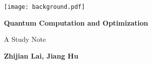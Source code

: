 \documentclass[
	11pt, %
	fleqn, %
	a4paper, %
]{LegrandOrangeBook}
\begin{document}

\titlepage %
	{\texttt{[image: background.pdf]}} %
	{ %
		\centering\sffamily %
		{\Huge\bfseries
        Quantum Computation and Optimization
        \par} %
		\vspace{16pt} %
		{\LARGE A Study Note\par} %
		\vspace{24pt} %
		{\huge\bfseries Zhijian Lai, Jiang Hu\par} %
	}







\end{document}
